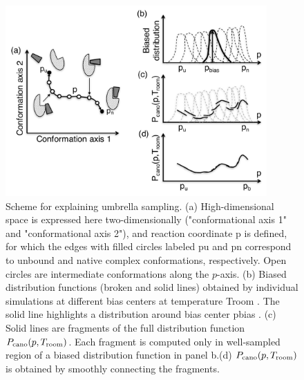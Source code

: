 \begin{figure}
  \centering
  \includegraphics[width=10cm]{../enhance_rev/figures/us_picture.pdf}
  \caption{\label{fig:us_picture.pdf} Scheme for explaining umbrella sampling. (a) High-dimensional space is expressed here two-dimensionally ("conformational axis 1" and "conformational axis 2"), and reaction coordinate p is defined, for which the edges with filled circles labeled pu and pn correspond to unbound and native complex conformations, respectively. Open circles are intermediate conformations along the $p$-axis. (b) Biased distribution functions (broken and solid lines) obtained by individual simulations at different bias centers at temperature Troom . The solid line highlights a distribution around bias center pbias . (c) Solid lines are fragments of the full distribution function $P_{\rm cano}(p,T_{\rm room})$. Each fragment is computed only in well-sampled region of a biased distribution function in panel b.(d) $P_{\rm cano}(p,T_{\rm room})$ is obtained by smoothly connecting the fragments.}
\end{figure}

